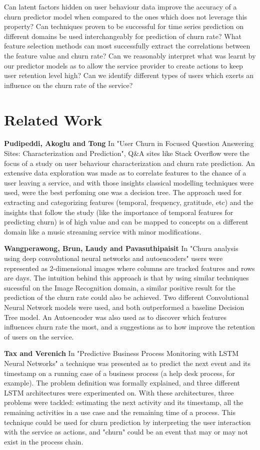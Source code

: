 \documentclass{kththesis}
\begin{document}
	Can latent factors hidden on user behaviour data improve the accuracy of a churn predictor model when compared to the ones which does not leverage this property? Can techniques proven to be successful for time series prediction on different domains be used interchangeably for prediction of churn rate? What feature selection methods can most successfully extract the correlations between the feature value and churn rate? Can we reasonably interpret what was learnt by our predictor models as to allow the service provider to create actions to keep user retention level high? Can we identify different types of users which exerts an influence on the churn rate of the service?

\chapter{Related Work}

\textbf{Pudipeddi, Akoglu and Tong} \citep{Pudipeddi2014} In "User Churn in Focused Question Answering Sites: Characterization and Prediction", Q\&A sites like Stack Overflow were the focus of a study on user behaviour characterization and churn rate prediction. An extensive data exploration was made as to correlate features to the chance of a user leaving a service, and with those insights classical modelling techniques were used, were the best perfoming one was a decision tree. The approach used for extracting and categorizing features (temporal, frequency, gratitude, etc) and the insights that follow the study (like the importance of temporal features for predicting churn) is of high value and can be mapped to concepts on a different domain like a music streaming service with minor modifications.

\textbf{Wangperawong, Brun, Laudy and Pavasuthipaisit} \citep{Wangperawong2016} In "Churn analysis using deep convolutional neural networks and autoencoders" users were represented as 2-dimensional images where columns are tracked features and rows are days. The intuition behind this approach is that by using similar techniques sucessful on the Image Recognition domain, a similar positive result for the prediction of the churn rate could also be achieved. Two different Convolutional Neural Network models were used, and both outperformed a baseline Decision Tree model. An Autoencoder was also used as to discover which features influences churn rate the most, and a suggestions as to how improve the retention of users on the service.

\textbf{Tax and Verenich} \citep{Tax2016} In "Predictive Business Process Monitoring with LSTM Neural Networks" a technique was presented as to predict the next event and its timestamp on a running case of a business process (a help desk process, for example). The problem definition was formally explained, and three different LSTM architectures were experimented on. With these architectures, three problems were tackled: estimating the next activity and its timestamp, all the remaining activities in a use case and the remaining time of a process. This technique could be used for churn prediction by interpreting the user interaction with the service as actions, and "churn" could be an event that may or may not exist in the process chain.
\end{document}
